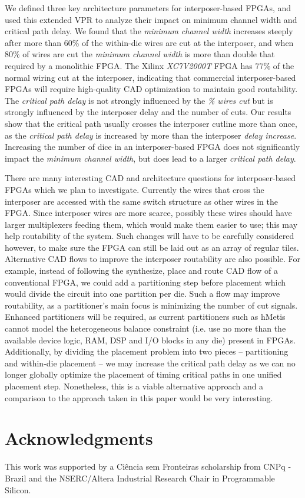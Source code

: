 \documentclass{sig-alternate-2013}
\begin{document}
We defined three key architecture parameters for interposer-based FPGAs, and used this extended VPR to analyze their impact on minimum channel width and critical path delay. We found that the \textit{minimum channel width} increases steeply after more than 60\% of the within-die wires are cut at the interposer, and when 80\% of wires are cut the \textit{minimum channel width} is more than double that required by a monolithic FPGA. The Xilinx \textit{XC7V2000T} FPGA has 77\% of the normal wiring cut at the interposer, indicating that commercial interposer-based FPGAs will require high-quality CAD optimization to maintain good routability. The \textit{critical path delay} is not strongly influenced by the \textit{\% wires cut} but is strongly influenced by the interposer delay and the number of cuts. Our results show that the critical path usually crosses the interposer cutline more than once, as the \textit{critical path delay} is increased by more than the interposer \textit{delay increase}. Increasing the number of dice in an interposer-based FPGA does not significantly impact the \textit{minimum channel width}, but does lead to a larger \textit{critical path delay}.

There are many interesting CAD and architecture questions for interposer-based FPGAs which we plan to investigate.  Currently the wires that cross the interposer are accessed with the same switch structure as other wires in the FPGA. Since interposer wires are more scarce, possibly these wires should have larger multiplexers feeding them, which would make them easier to use; this may help routability of the system. Such changes will have to be carefully considered however, to make sure the FPGA can still be laid out as an array of regular tiles. Alternative CAD flows to improve the interposer routability are also possible. For example, instead of following the synthesize, place and route CAD flow of a conventional FPGA, we could add a partitioning step before placement which would divide the circuit into one partition per die. Such a flow may improve routability, as a partitioner's main focus is minimizing the number of cut signals. Enhanced partitioners will be required, as current partitioners such as hMetis~\cite{hMetis} cannot model the heterogeneous balance constraint (i.e. use no more than the available device logic, RAM, DSP and I/O blocks in any die) present in FPGAs. Additionally, by dividing the placement problem into two pieces -- partitioning and within-die placement -- we may increase the critical path delay as we can no longer globally optimize the placement of timing critical paths in one unified placement step. Nonetheless, this is a viable alternative approach and a comparison to the approach taken in this paper would be very interesting.

\section{Acknowledgments}

This work was supported by a Ci\^{e}ncia sem Fronteiras scholarship from CNPq - Brazil and the NSERC/Altera Industrial Research Chair in Programmable Silicon.
%



\balancecolumns
\end{document}
